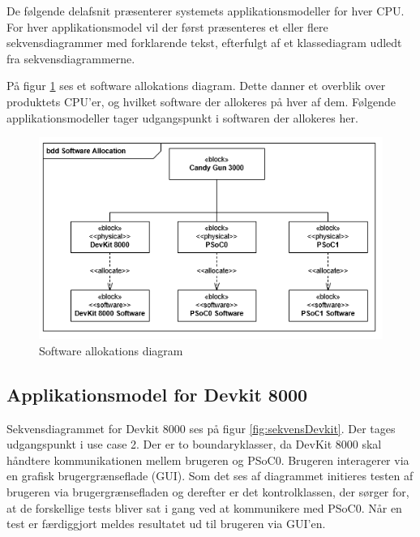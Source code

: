 De følgende delafsnit præsenterer systemets applikationsmodeller for hver CPU. For hver applikationsmodel vil der først præsenteres et eller flere sekvensdiagrammer med forklarende tekst, efterfulgt af et klassediagram udledt fra sekvensdiagrammerne.

På figur \ref{fig:softwareAllocation} ses et software allokations diagram. Dette danner et overblik over produktets CPU'er, og hvilket software der allokeres på hver af dem. Følgende applikationsmodeller tager udgangspunkt i softwaren der allokeres her.

\begin{figure}[H]
	\centering
	\includegraphics[width=\textwidth]{Systemarkitektur/images/SoftwareAllocation.png}
	\caption{Software allokations diagram}
	\label{fig:softwareAllocation}
\end{figure}

\subsection{Applikationsmodel for Devkit 8000}
Sekvensdiagrammet for Devkit 8000 ses på figur \ref{fig:sekvensDevkit}. Der tages udgangspunkt i use case 2. Der er to boundaryklasser, da DevKit 8000 skal håndtere kommunikationen mellem brugeren og PSoC0. Brugeren interagerer via en grafisk brugergrænseflade (GUI). Som det ses af diagrammet initieres testen af brugeren via brugergrænsefladen og derefter er det kontrolklassen, der sørger for, at de forskellige tests bliver sat i gang ved at kommunikere med PSoC0. Når en test er færdiggjort meldes resultatet ud til brugeren via GUI'en.

